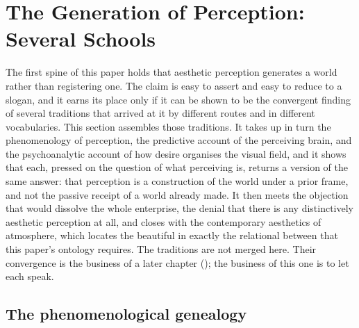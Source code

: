 \section{The Generation of Perception: Several Schools}
\label{p23:sec:generation}

\noindent
The first spine of this paper holds that aesthetic perception generates a world rather than registering one. The claim is easy to assert and easy to reduce to a slogan, and it earns its place only if it can be shown to be the convergent finding of several traditions that arrived at it by different routes and in different vocabularies. This section assembles those traditions. It takes up in turn the phenomenology of perception, the predictive account of the perceiving brain, and the psychoanalytic account of how desire organises the visual field, and it shows that each, pressed on the question of what perceiving is, returns a version of the same answer: that perception is a construction of the world under a prior frame, and not the passive receipt of a world already made. It then meets the objection that would dissolve the whole enterprise, the denial that there is any distinctively aesthetic perception at all, and closes with the contemporary aesthetics of atmosphere, which locates the beautiful in exactly the relational between that this paper's ontology requires. The traditions are not merged here. Their convergence is the business of a later chapter (); the business of this one is to let each speak.

\subsection{The phenomenological genealogy}
\label{p23:sub:gen-phenomenology}


